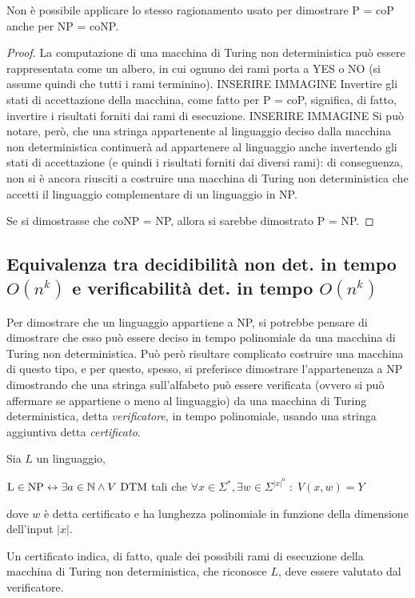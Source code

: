 \begin{rem}
    Non è possibile applicare lo stesso ragionamento usato per dimostrare P = coP anche per NP = coNP.
\end{rem}
\begin{proof}
    La computazione di una macchina di Turing non deterministica può essere rappresentata come un albero, in cui ognuno dei rami porta a YES o NO (si assume quindi che tutti i rami terminino).
    INSERIRE IMMAGINE
    Invertire gli stati di accettazione della macchina, come fatto per P = coP, significa, di fatto, invertire i risultati forniti dai rami di esecuzione.
    INSERIRE IMMAGINE
    Si può notare, però, che una stringa appartenente al linguaggio deciso dalla macchina non deterministica continuerà ad appartenere al linguaggio anche invertendo gli stati di accettazione (e quindi i risultati forniti dai diversi rami): di conseguenza, non si è ancora riusciti a costruire una macchina di Turing non deterministica che accetti il linguaggio complementare di un linguaggio in NP.

    Se si dimostrasse che coNP = NP, allora si sarebbe dimostrato P = NP.
\end{proof}


\subsection*{Equivalenza tra decidibilità non det. in tempo $O(n^k)$ e verificabilità det. in tempo $O(n^k)$}
Per dimostrare che un linguaggio appartiene a NP, si potrebbe pensare di dimostrare che esso può essere deciso in tempo polinomiale da una macchina di Turing non deterministica. Può però risultare complicato costruire una macchina di questo tipo, e per questo, spesso, si preferisce dimostrare l'appartenenza a NP dimostrando che una stringa sull'alfabeto può essere verificata (ovvero si può affermare se appartiene o meno al linguaggio) da una macchina di Turing deterministica, detta \textit{verificatore}, in tempo polinomiale, usando una stringa aggiuntiva detta \textit{certificato}.

\begin{thm}
    Sia $L$ un linguaggio,
    \begin{center}
        $\textnormal{L} \in \textnormal{NP} \leftrightarrow \exists a \in \mathbb{N} \land V \textnormal{ DTM}$ tali che $\forall x \in \Sigma^*, \exists w \in \Sigma^{|x|^a}\; : \; V(x, w) = Y$
    \end{center}
    dove $w$ è detta certificato e ha lunghezza polinomiale in funzione della dimensione dell'input $|x|$.
\end{thm}
Un certificato indica, di fatto, quale dei possibili rami di esecuzione della macchina di Turing non deterministica, che riconosce $L$, deve essere valutato dal verificatore.

